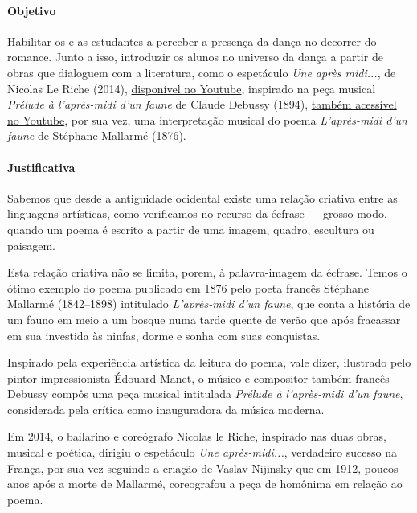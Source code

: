 \documentclass[12pt]{extarticle}
\begin{document}
\paragraph{Objetivo} Habilitar os e as estudantes a perceber a presença
da dança no decorrer do romance. Junto a isso, introduzir os alunos
no universo da dança a partir de obras que dialoguem com a literatura,
como o espetáculo \textit{Une après midi...}, de Nicolas Le Riche
(2014), \href{https://www.youtube.com/watch?v=pU2juDnSTTg}{disponível no Youtube}, inspirado na peça musical \textit{Prélude à l'après-midi
d'un faune} de Claude Debussy (1894), \href{https://www.youtube.com/watch?v=bYyK922PsUw}{também acessível no Youtube}, por sua
vez, uma interpretação musical do poema \textit{L'après-midi d'un faune} 
de Stéphane Mallarmé (1876).

\paragraph{Justificativa} Sabemos que desde a antiguidade ocidental existe
uma relação criativa entre as linguagens artísticas, como verificamos
no recurso da écfrase --- grosso modo, quando um poema é escrito 
a partir de uma imagem, quadro, escultura ou paisagem. 

Esta relação criativa não se limita, porem, à palavra-imagem da écfrase. 
Temos o ótimo exemplo do poema publicado em 1876 pelo poeta francês Stéphane Mallarmé (1842--1898) intitulado
\textit{L'après-midi d'un faune}, que conta a história de um fauno em meio
a um bosque numa tarde quente de verão que após fracassar em sua investida
às ninfas, dorme e sonha com suas conquistas. 

Inspirado pela experiência artística da leitura do poema, vale dizer, ilustrado 
pelo pintor impressionista Édouard Manet, o músico e compositor também
francês Debussy compôs uma peça musical intitulada \textit{Prélude à l'après-midi
d'un faune}, considerada pela crítica como inauguradora da música moderna. 

Em 2014, o bailarino e coreógrafo Nicolas le Riche, inspirado nas duas obras,
musical e poética, dirigiu o espetáculo \textit{Une après-midi...}, verdadeiro 
sucesso na França, por sua vez seguindo a criação de Vaslav Nijinsky
que em 1912, poucos anos após a morte de Mallarmé, coreografou a peça de homônima
em relação ao poema. 
\end{document}

